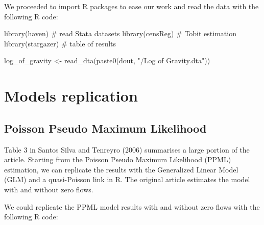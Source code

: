 \documentclass[12pt]{article}
\newenvironment{Shaded}{\begin{snugshade}}{\end{snugshade}}
\newcommand{\CommentTok}[1]{\textcolor[rgb]{0.37,0.37,0.37}{#1}}
\newcommand{\FunctionTok}[1]{\textcolor[rgb]{0.28,0.35,0.67}{#1}}
\newcommand{\NormalTok}[1]{\textcolor[rgb]{0.00,0.23,0.31}{#1}}
\newcommand{\OtherTok}[1]{\textcolor[rgb]{0.00,0.23,0.31}{#1}}
\newcommand{\StringTok}[1]{\textcolor[rgb]{0.13,0.47,0.30}{#1}}
\begin{document}
We proceeded to import R packages to ease our work and read the data
with the following R code:

\begin{Shaded}
\begin{Highlighting}[]
\FunctionTok{library}\NormalTok{(haven) }\CommentTok{\# read Stata datasets}
\FunctionTok{library}\NormalTok{(censReg) }\CommentTok{\# Tobit estimation}
\FunctionTok{library}\NormalTok{(stargazer) }\CommentTok{\# table of results}

\NormalTok{log\_of\_gravity }\OtherTok{\textless{}{-}} \FunctionTok{read\_dta}\NormalTok{(}\FunctionTok{paste0}\NormalTok{(dout, }\StringTok{"/Log of Gravity.dta"}\NormalTok{))}
\end{Highlighting}
\end{Shaded}

\section{Models replication}\label{models-replication}

\subsection{Poisson Pseudo Maximum
Likelihood}\label{poisson-pseudo-maximum-likelihood}

Table 3 in Santos Silva and Tenreyro (2006) summarises a large portion
of the article. Starting from the Poisson Pseudo Maximum Likelihood
(PPML) estimation, we can replicate the results with the Generalized
Linear Model (GLM) and a quasi-Poisson link in R. The original article
estimates the model with and without zero flows.

We could replicate the PPML model results with and without zero flows
with the following R code:
\end{document}
